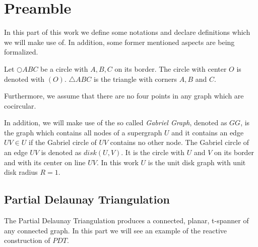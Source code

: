 \section{Preamble}
In this part of this work we define some notations and declare definitions which we will make use of.
In addition, some former mentioned aspects are being formalized.
 
Let $\bigcirc{ABC} $ be a circle with $A, B, C $ on its border.
The circle with center $O $ is denoted with $(O) $.
$\triangle{ABC} $ is the triangle with corners $A,B $ and $C $.

Furthermore, we assume that there are no four points in any graph which are cocircular.

In addition, we will make use of the so called \emph{Gabriel Graph}, denoted as $GG $, is the graph which contains all nodes of a supergraph $U $ and it contains an edge $UV \in U $ if the Gabriel circle of $UV $ contains no other node.
The Gabriel circle of an edge $UV $ is denoted as $disk(U, V) $.
It is the circle with $U $ and $V $ on its border and with its center on line $UV $. 
In this work $U $ is the unit disk graph with unit disk radius $R = 1 $.

\subsection{Partial Delaunay Triangulation}
The Partial Delaunay Triangulation produces a connected, planar, t-spanner of any connected graph.
In this part we will see an example of the reactive construction of $PDT $.

